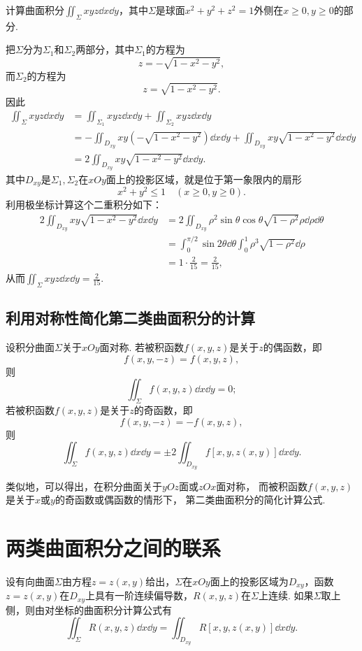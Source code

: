 \begin{example}
计算曲面积分\(\iint_{\Sigma} xyz \dd{x}\dd{y}\)，其中\(\Sigma\)是球面\(x^2+y^2+z^2=1\)外侧在\(x\geqslant0,y\geqslant0\)的部分.
\begin{solution}
把\(\Sigma\)分为\(\Sigma_1\)和\(\Sigma_2\)两部分，其中\(\Sigma_1\)的方程为\[
z = -\sqrt{1-x^2-y^2},
\]而\(\Sigma_2\)的方程为\[
z = \sqrt{1-x^2-y^2}.
\]因此\begin{align*}
\iint_{\Sigma} xyz \dd{x}\dd{y}
&= \iint_{\Sigma_1} xyz \dd{x}\dd{y}
+ \iint_{\Sigma_2} xyz \dd{x}\dd{y} \\
&= -\iint_{D_{xy}} xy (-\sqrt{1-x^2-y^2}) \dd{x}\dd{y}
+ \iint_{D_{xy}} xy \sqrt{1-x^2-y^2} \dd{x}\dd{y} \\
&= 2 \iint_{D_{xy}} xy \sqrt{1-x^2-y^2} \dd{x}\dd{y}.
\end{align*}
其中\(D_{xy}\)是\(\Sigma_1,\Sigma_2\)在\(xOy\)面上的投影区域，就是位于第一象限内的扇形\[
x^2+y^2\leqslant1 \quad(x\geqslant0,y\geqslant0).
\]利用极坐标计算这个二重积分如下：\begin{align*}
2 \iint_{D_{xy}} xy \sqrt{1-x^2-y^2} \dd{x}\dd{y}
&= 2 \iint_{D_{xy}} \rho^2 \sin\theta \cos\theta \sqrt{1-\rho^2} \rho\dd{\rho}\dd{\theta} \\
&= \int_0^{\pi/2} \sin2\theta \dd{\theta} \int_0^1 \rho^3 \sqrt{1-\rho^2} \dd{\rho} \\
&= 1 \cdot \frac{2}{15} = \frac{2}{15},
\end{align*}
从而\(\iint_{\Sigma} xyz \dd{x}\dd{y} = \frac{2}{15}\).
\end{solution}
\end{example}

\subsection{利用对称性简化第二类曲面积分的计算}
设积分曲面\(\Sigma\)关于\(xOy\)面对称.
若被积函数\(f(x,y,z)\)是关于\(z\)的偶函数，即\[
	f(x,y,-z) = f(x,y,z),
\]
则\[
	\iint_{\Sigma} f(x,y,z) \dd{x}\dd{y} = 0;
\]
若被积函数\(f(x,y,z)\)是关于\(z\)的奇函数，即\[
	f(x,y,-z) = -f(x,y,z),
\]
则\[
	\iint_{\Sigma} f(x,y,z) \dd{x}\dd{y} = \pm2 \iint_{D_{xy}} f[x,y,z(x,y)] \dd{x}\dd{y}.
\]

类似地，可以得出，在积分曲面关于\(yOz\)面或\(zOx\)面对称，
而被积函数\(f(x,y,z)\)是关于\(x\)或\(y\)的奇函数或偶函数的情形下，
第二类曲面积分的简化计算公式.

\section{两类曲面积分之间的联系}
设有向曲面\(\Sigma\)由方程\(z = z(x,y)\)给出，\(\Sigma\)在\(xOy\)面上的投影区域为\(D_{xy}\)，函数\(z = z(x,y)\)在\(D_{xy}\)上具有一阶连续偏导数，\(R(x,y,z)\)在\(\Sigma\)上连续.
如果\(\Sigma\)取上侧，则由对坐标的曲面积分计算公式有\[
\iint_{\Sigma} R(x,y,z) \dd{x}\dd{y} = \iint_{D_{xy}} R[x,y,z(x,y)] \dd{x}\dd{y}.
\]

